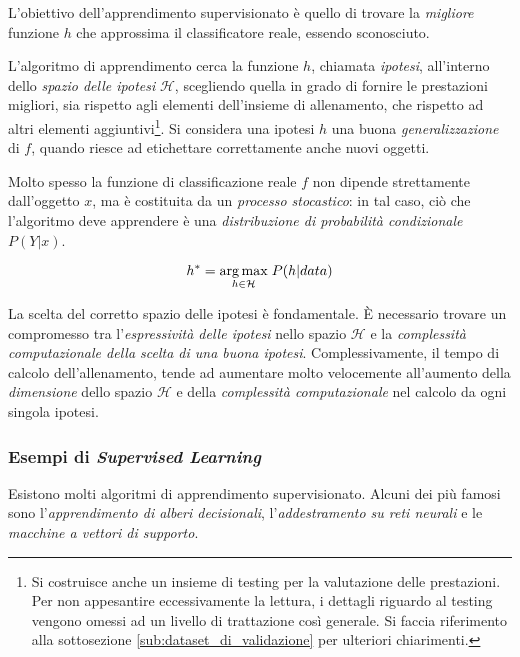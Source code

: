                 L'obiettivo dell'apprendimento supervisionato è quello di trovare la \emph{migliore} funzione $h$ che approssima il classificatore reale, essendo sconosciuto.

                L'algoritmo di apprendimento cerca la funzione $h$, chiamata \emph{ipotesi}, all'interno dello \emph{spazio delle ipotesi} $\mathcal{H}$, scegliendo quella in grado di fornire le prestazioni migliori, sia rispetto agli elementi dell'insieme di allenamento, che rispetto ad altri elementi aggiuntivi\footnote{Si costruisce anche un insieme di testing per la valutazione delle prestazioni. Per non appesantire eccessivamente la lettura, i dettagli riguardo al testing vengono omessi ad un livello di trattazione così generale. Si faccia riferimento alla sottosezione \ref{sub:dataset_di_validazione} per ulteriori chiarimenti.}.
                Si considera una ipotesi $h$ una buona \emph{generalizzazione} di $f$, quando riesce ad etichettare correttamente anche nuovi oggetti.

                Molto spesso la funzione di classificazione reale $f$ non dipende strettamente dall'oggetto $x$, ma è costituita da un \emph{processo stocastico}: in tal caso, ciò che l'algoritmo deve apprendere è una \emph{distribuzione di probabilità condizionale} $P(Y|x)$.

                \begin{equation}
                    \label{subeq:stochastic_hypotesis_choice}
                    h^* = \underset{h \in \mathcal{H}}{\operatorname{arg}\operatorname{max}}\;{P(h | data)}
                \end{equation}

                La scelta del corretto spazio delle ipotesi è fondamentale.
                È necessario trovare un compromesso tra l'\emph{espressività delle ipotesi} nello spazio $\mathcal{H}$ e la \emph{complessità computazionale della scelta di una buona ipotesi}.
                Complessivamente, il tempo di calcolo dell'allenamento, tende ad aumentare molto velocemente all'aumento della \emph{dimensione} dello spazio $\mathcal{H}$ e della \emph{complessità computazionale} nel calcolo da ogni singola ipotesi.  

            \subsubsection{Esempi di \emph{Supervised Learning}}
            \label{subsub:supervised_learning_examples}
                Esistono molti algoritmi di apprendimento supervisionato.
                Alcuni dei più famosi sono l'\emph{apprendimento di alberi decisionali}, l'\emph{addestramento su reti neurali} e le \emph{macchine a vettori di supporto}.

